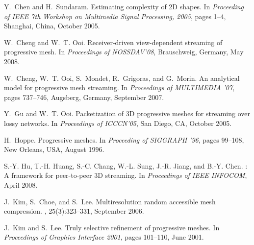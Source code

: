 \documentclass{sig-alt-release2}
\begin{document}
\begin{thebibliography}{50}
\vspace*{0.7mm}
\footnotesize
{}
Y.~Chen and H.~Sundaram.
\newblock Estimating complexity of 2{D} shapes.
\newblock In {\em Proceeding of IEEE 7th Workshop on Multimedia Signal
  Processing, 2005}, pages 1--4, Shanghai, China, October 2005.

W.~Cheng and W.~T. Ooi.
\newblock Receiver-driven view-dependent streaming of progressive mesh.
\newblock In {\em Proceedings of NOSSDAV'08}, Brauschweig, Germany, May 2008.

W.~Cheng, W.~T. Ooi, S.~Mondet, R.~Grigoras, and G.~Morin.
\newblock An analytical model for progressive mesh streaming.
\newblock In {\em Proceedings of MULTIMEDIA '07}, pages 737--746, Augsberg,
  Germany, September 2007.

Y.~Gu and W.~T. Ooi.
\newblock Packetization of 3{D} progressive meshes for streaming over lossy
  networks.
\newblock In {\em Proceedings of ICCCN'05}, San Diego, CA, October 2005.

H.~Hoppe.
\newblock Progressive meshes.
\newblock In {\em Proceeding of SIGGRAPH '96}, pages 99--108, New Orleans, USA,
  August 1996.

S.-Y. Hu, T.-H. Huang, S.-C. Chang, W.-L. Sung, J.-R. Jiang, and B.-Y. Chen.
: A framework for peer-to-peer {3D} streaming.
\newblock In {\em Proceedings of IEEE INFOCOM}, April 2008.

J.~Kim, S.~Choe, and S.~Lee.
\newblock Multiresolution random accessible mesh compression.
, 25(3):323--331, September 2006.

J.~Kim and S.~Lee.
\newblock Truly selective refinement of progressive meshes.
\newblock In {\em Proceedings of Graphics Interface 2001}, pages 101--110, June
  2001.

\end{thebibliography}
%
%
\end{document}
